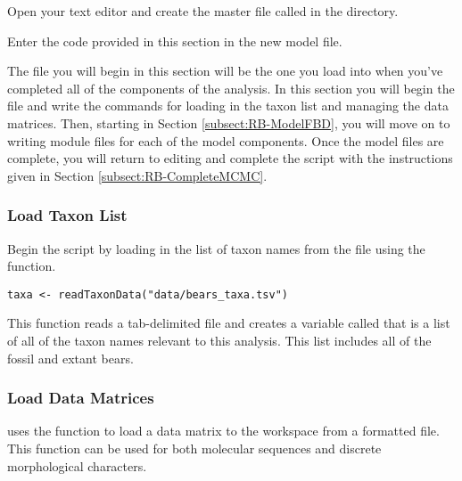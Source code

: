 {\begin{framed}
Open your text editor and create the master \Rev file called {\textcolor{red}{}} in the  directory.

Enter the \Rev code provided in this section in the new model file.
\end{framed}}

The file you will begin in this section will be the one you load into \RevBayes when you've completed all of the components of the analysis.
In this section you will begin the file and write the \Rev commands for loading in the taxon list and managing the data matrices.
Then, starting in Section \ref{subsect:RB-ModelFBD}, you will move on to writing module files for each of the model components. 
Once the model files are complete, you will return to editing  and complete the \Rev script with the instructions given in Section \ref{subsect:RB-CompleteMCMC}.


\medskip
\subsubsection{Load Taxon List}\label{subsub:RB-TaxList}

Begin the \Rev script by loading in the list of taxon names from the  file using the  function.
\begin{snugshade*}
\begin{lstlisting}
taxa <- readTaxonData("data/bears_taxa.tsv")
\end{lstlisting}
\end{snugshade*}
This function reads a tab-delimited file and creates a variable called  that is a list of all of the taxon names relevant to this analysis. 
This list includes all of the fossil and extant bears.



\medskip
\subsubsection{Load Data Matrices}\label{subsub:RB-LoadData}

\RevBayes uses the function  to load a data matrix to the workspace from a formatted file. 
This function can be used for both molecular sequences and discrete morphological characters.

